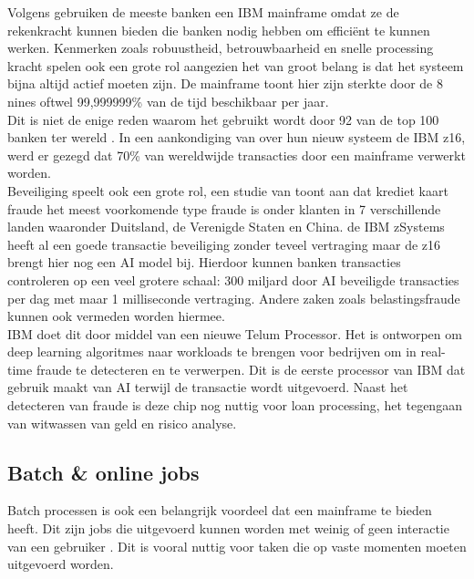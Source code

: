 Volgens \textcite{Turner2022} gebruiken de meeste banken een IBM mainframe omdat ze de rekenkracht kunnen bieden die banken nodig hebben om efficiënt te kunnen werken. Kenmerken zoals robuustheid, betrouwbaarheid en snelle processing kracht spelen ook een grote rol aangezien het van groot belang is dat het systeem bijna altijd actief moeten zijn. De mainframe toont hier zijn sterkte door de 8 nines oftwel 99,999999\% van de tijd beschikbaar per jaar. \autocite{IBMa} \\

Dit is niet de enige reden waarom het gebruikt wordt door 92 van de top 100 banken ter wereld \autocite{Tozzi2022}. In een aankondiging van \textcite{IBM2022} over hun nieuw systeem de IBM z16, werd er gezegd dat 70\% van wereldwijde transacties door een mainframe verwerkt worden. \\

Beveiliging speelt ook een grote rol, een studie van \textcite{MorningConsult2022} toont aan dat krediet kaart fraude het meest voorkomende type fraude is onder klanten in 7 verschillende landen waaronder Duitsland, de Verenigde Staten en China. de IBM zSystems heeft al een goede transactie beveiliging zonder teveel vertraging maar de z16 brengt hier nog een AI model bij. Hierdoor kunnen banken transacties controleren op een veel grotere schaal: 300 miljard door AI beveiligde transacties per dag met maar 1 milliseconde vertraging. Andere zaken zoals belastingsfraude kunnen ook vermeden worden hiermee. \autocite{IBM2022} \\

IBM doet dit door middel van een nieuwe Telum Processor. Het is ontworpen om deep learning algoritmes naar workloads te brengen voor bedrijven om in real-time fraude te detecteren en te verwerpen. Dit is de eerste processor van IBM dat gebruik maakt van AI terwijl de transactie wordt uitgevoerd. Naast het detecteren van fraude is deze chip nog nuttig voor loan processing, het tegengaan van witwassen van geld en risico analyse. \autocite{IBM2021a} \\

\subsection{Batch \& online jobs}
Batch processen is ook een belangrijk voordeel dat een mainframe te bieden heeft. Dit zijn jobs die uitgevoerd kunnen worden met weinig of geen interactie van een gebruiker \autocite{IBM}. Dit is vooral nuttig voor taken die op vaste momenten moeten uitgevoerd worden.

